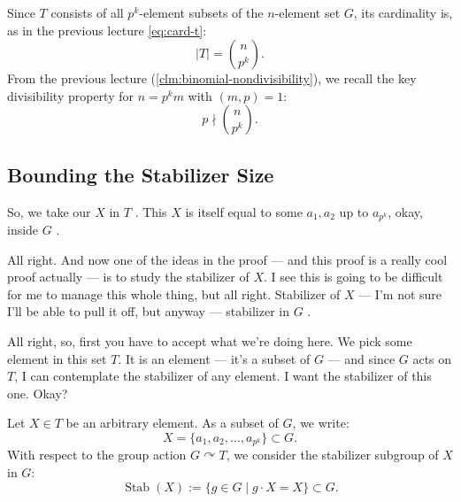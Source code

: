 \begin{proofWrapper}
\begin{content}
Since $T$ consists of all $p^k$-element subsets of the $n$-element set $G$, its cardinality is, as in the previous lecture \eqref{eq:card-t}:
\begin{equation}\label{eq:cardinality-T}
|T| = \binom{n}{p^k}.
\end{equation}
From the previous lecture (\cref{clm:binomial-nondivisibility}), we recall the key divisibility property for $n = p^k m$ with $(m, p) = 1$:
\begin{equation}\label{eq:p-not-div-binom}
\boxed{p \nmid \binom{n}{p^k}}.
\end{equation}
\end{content}

\subsection{Bounding the Stabilizer Size}

\begin{speech}[00:06:39 - 00:07:47]
So, we take our $X$ in $T$ . This $X$ is itself equal to some $a_1, a_2$ up to $a_{p^k}$, okay, inside $G$ .

All right. And now one of the ideas in the proof --- and this proof is a really cool proof actually --- is to study the stabilizer of $X$. I see this is going to be difficult for me to manage this whole thing, but all right. Stabilizer of $X$ --- I'm not sure I'll be able to pull it off, but anyway --- stabilizer in $G$ .

All right, so, first you have to accept what we're doing here. We pick some element in this set $T$. It is an element --- it's a subset of $G$ --- and since $G$ acts on $T$, I can contemplate the stabilizer of any element. I want the stabilizer of this one. Okay?
\end{speech}

\begin{content}
Let $X \in T$ be an arbitrary element. As a subset of $G$, we write:
\[
X = \{a_1, a_2, \dots, a_{p^k}\} \subset G.
\]
With respect to the group action $G \curvearrowright T$, we consider the stabilizer subgroup of $X$ in $G$:
\[
\operatorname{Stab}(X) := \{ g \in G \mid g \cdot X = X \} \subset G.
\]
\end{content}


\end{proofWrapper}
